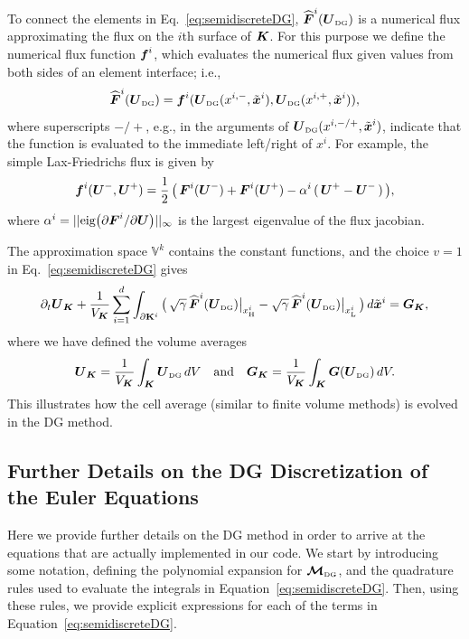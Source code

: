 \documentclass[10pt,preprint]{aastex}
\newcommand{\pbK}{\partial\mathbf{K}}
\newcommand{\sumx}{\sum_{i=1}^{d}}
\begin{document}
To connect the elements in Eq.~\eqref{eq:semidiscreteDG}, $\widehat{\boldsymbol{F}}^{i}(\boldsymbol{U}_{\mbox{\tiny DG}})$ is a numerical flux approximating the flux on the $i$th surface of $\boldsymbol{K}$.  
For this purpose we define the numerical flux function $\boldsymbol{f}^{i}$, which evaluates the numerical flux given values from both sides of an element interface; i.e.,
\begin{equation}
  \widehat{\boldsymbol{F}}^{i}(\boldsymbol{U}_{\mbox{\tiny DG}})=\boldsymbol{f}^{i}(\boldsymbol{U}_{\mbox{\tiny DG}}(x^{i,-},\tilde{\boldsymbol{x}}^{i}),\boldsymbol{U}_{\mbox{\tiny DG}}(x^{i,+},\tilde{\boldsymbol{x}}^{i})),
\end{equation}
where superscripts $-/+$, e.g., in the arguments of $\boldsymbol{U}_{\mbox{\tiny DG}}(x^{i,-/+},\tilde{\boldsymbol{x}}^{i})$, indicate that the function is evaluated to the immediate left/right of $x^{i}$.  
For example, the simple Lax-Friedrichs flux is given by
\begin{equation}
  \boldsymbol{f}^{i}(\boldsymbol{U}^{-},\boldsymbol{U}^{+})
  =\frac{1}{2}\,\big(\,\boldsymbol{F}^{i}(\boldsymbol{U}^{-})+\boldsymbol{F}^{i}(\boldsymbol{U}^{+})-\alpha^{i}\,(\,\boldsymbol{U}^{+}-\boldsymbol{U}^{-}\,)\,\big),
\end{equation}
where $\alpha^{i}=||\mbox{eig}\big(\partial\boldsymbol{F}^{i}/\partial\boldsymbol{U}\big)||_{\infty}$ is the largest eigenvalue of the flux jacobian.  

The approximation space $\mathbb{V}^{k}$ contains the constant functions, and the choice $v=1$ in Eq.~\eqref{eq:semidiscreteDG} gives
\begin{equation}
  \partial_{t}\bU_{\bK}
  +\f{1}{V_{\bK}}\sumx\int_{\pbK^{i}}\big(\,\sqrt{\gamma}\,\widehat{\vect{F}}^{i}(\bU_{\DG})\big|_{\xH^{i}}-\sqrt{\gamma}\,\widehat{\vect{F}}^{i}(\bU_{\DG})\big|_{\xL^{i}}\,\big)\,d\tilde{\bx}^{i}
  =\bG_{\bK},
\end{equation}
where we have defined the volume averages
\begin{equation}
  \boldsymbol{U}_{\boldsymbol{K}}=\frac{1}{V_{\boldsymbol{K}}}\int_{\boldsymbol{K}}\boldsymbol{U}_{\mbox{\tiny DG}}\,dV \quad\text{and}\quad
  \boldsymbol{G}_{\boldsymbol{K}}=\frac{1}{V_{\boldsymbol{K}}}\int_{\boldsymbol{K}}\boldsymbol{G}(\boldsymbol{U}_{\mbox{\tiny DG}})\,dV.  
\end{equation}
This illustrates how the cell average (similar to finite volume methods) is evolved in the DG method.  

\subsection{Further Details on the DG Discretization of the Euler Equations}

Here we provide further details on the DG method in order to arrive at the equations that are actually implemented in our code.  
We start by introducing some notation, defining the polynomial expansion for $\boldsymbol{\mathcal{M}}_{\mbox{\tiny DG}}$, and the quadrature rules used to evaluate the integrals in Equation~\eqref{eq:semidiscreteDG}.  
Then, using these rules, we provide explicit expressions for each of the terms in Equation~\eqref{eq:semidiscreteDG}.  
\end{document}
